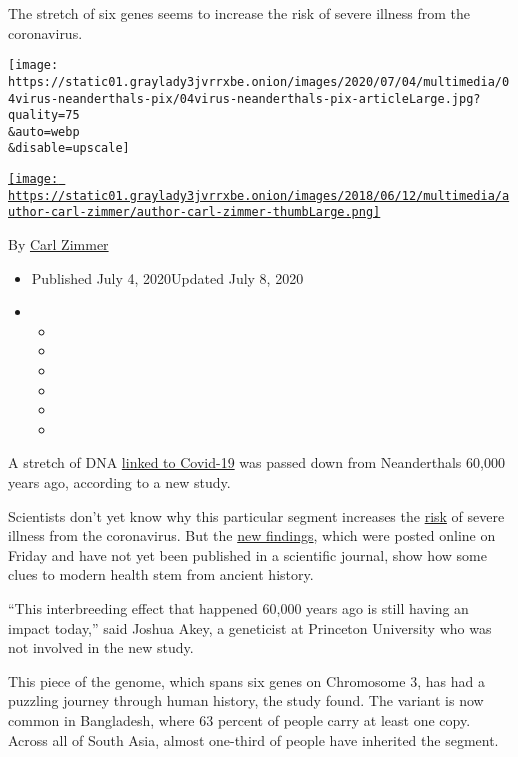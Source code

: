 The stretch of six genes seems to increase the risk of severe illness
from the coronavirus.

\texttt{[image: https://static01.graylady3jvrrxbe.onion/images/2020/07/04/multimedia/04virus-neanderthals-pix/04virus-neanderthals-pix-articleLarge.jpg?quality=75\\\&auto=webp\\\&disable=upscale]}

\href{https://www.nytimes3xbfgragh.onion/by/carl-zimmer}{\texttt{[image: https://static01.graylady3jvrrxbe.onion/images/2018/06/12/multimedia/author-carl-zimmer/author-carl-zimmer-thumbLarge.png]}}

By \href{https://www.nytimes3xbfgragh.onion/by/carl-zimmer}{Carl Zimmer}

\begin{itemize}
\item
  Published July 4, 2020Updated July 8, 2020
\item
  \begin{itemize}
  \item
  \item
  \item
  \item
  \item
  \item
  \end{itemize}
\end{itemize}

A stretch of DNA
\href{https://www.nytimes3xbfgragh.onion/2020/06/03/health/coronavirus-blood-type-genetics.html}{linked
to Covid-19} was passed down from Neanderthals 60,000 years ago,
according to a new study.

Scientists don't yet know why this particular segment increases the
\href{https://www.nytimes3xbfgragh.onion/2020/07/08/health/coronavirus-risk-factors.html}{risk}
of severe illness from the coronavirus. But the
\href{https://www.biorxiv.org/content/10.1101/2020.07.03.186296v1.full.pdf+html}{new
findings}, which were posted online on Friday and have not yet been
published in a scientific journal, show how some clues to modern health
stem from ancient history.

``This interbreeding effect that happened 60,000 years ago is still
having an impact today,'' said Joshua Akey, a geneticist at Princeton
University who was not involved in the new study.

This piece of the genome, which spans six genes on Chromosome 3, has had
a puzzling journey through human history, the study found. The variant
is now common in Bangladesh, where 63 percent of people carry at least
one copy. Across all of South Asia, almost one-third of people have
inherited the segment.

